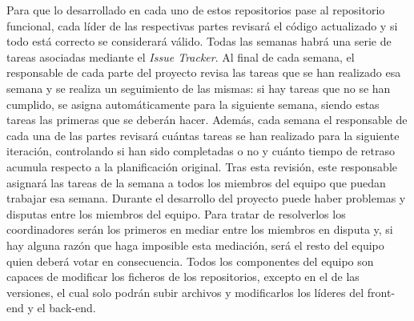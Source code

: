 \documentclass{article}
\begin{document}
\hfill \break
Para que lo desarrollado en cada uno de estos repositorios pase al repositorio funcional, cada líder de las respectivas partes revisará el código actualizado y si todo está correcto se considerará válido. 
\hfill \break
Todas las semanas habrá una serie de tareas asociadas mediante el \textit{Issue Tracker}. Al final de cada semana, el responsable de cada parte del proyecto revisa las tareas que se han realizado esa semana y se realiza un seguimiento de las mismas: si hay tareas que no se han cumplido, se asigna automáticamente para la siguiente semana, siendo estas tareas las primeras que se deberán hacer.  
\hfill \break
Además, cada semana el responsable de cada una de las partes revisará cuántas tareas se han realizado para la siguiente iteración, controlando si han sido completadas o no y cuánto tiempo de retraso acumula respecto a la planificación original.  Tras esta revisión, este responsable asignará las tareas de la semana a todos los miembros del equipo que puedan trabajar esa semana. 
\hfill \break
Durante el desarrollo del proyecto puede haber problemas y disputas entre los miembros del equipo. Para tratar de resolverlos los coordinadores serán los primeros en mediar entre los miembros en disputa y, si hay alguna razón que haga imposible esta mediación, será el resto del equipo quien deberá votar en consecuencia. 
\hfill \break
Todos los componentes del equipo son capaces de modificar los ficheros de los repositorios, excepto en el de las versiones, el cual solo podrán subir archivos y modificarlos los líderes del front-end y el back-end.
\end{document}
